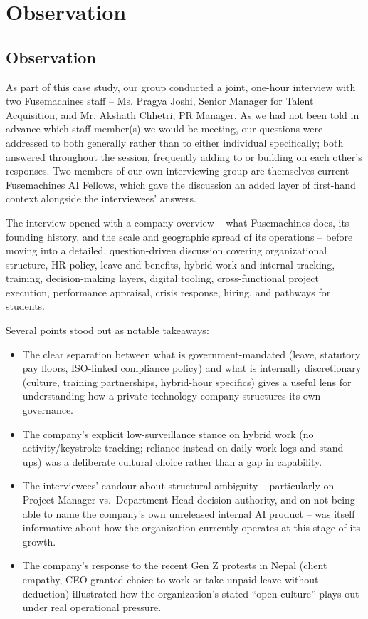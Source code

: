 \documentclass[12pt,a4paper]{report}
\begin{document}
\chapter{Observation}

\section{Observation}

As part of this case study, our group conducted a joint, one-hour interview with two Fusemachines staff -- Ms. Pragya Joshi, Senior Manager for Talent Acquisition, and Mr. Akshath Chhetri, PR Manager. As we had not been told in advance which staff member(s) we would be meeting, our questions were addressed to both generally rather than to either individual specifically; both answered throughout the session, frequently adding to or building on each other's responses. Two members of our own interviewing group are themselves current Fusemachines AI Fellows, which gave the discussion an added layer of first-hand context alongside the interviewees' answers.

The interview opened with a company overview -- what Fusemachines does, its founding history, and the scale and geographic spread of its operations -- before moving into a detailed, question-driven discussion covering organizational structure, HR policy, leave and benefits, hybrid work and internal tracking, training, decision-making layers, digital tooling, cross-functional project execution, performance appraisal, crisis response, hiring, and pathways for students.

Several points stood out as notable takeaways:
\begin{itemize}[leftmargin=1.5cm]
  \item The clear separation between what is government-mandated (leave, statutory pay floors, ISO-linked compliance policy) and what is internally discretionary (culture, training partnerships, hybrid-hour specifics) gives a useful lens for understanding how a private technology company structures its own governance.
  \item The company's explicit low-surveillance stance on hybrid work (no activity/keystroke tracking; reliance instead on daily work logs and stand-ups) was a deliberate cultural choice rather than a gap in capability.
  \item The interviewees' candour about structural ambiguity -- particularly on Project Manager vs.\ Department Head decision authority, and on not being able to name the company's own unreleased internal AI product -- was itself informative about how the organization currently operates at this stage of its growth.
  \item The company's response to the recent Gen Z protests in Nepal (client empathy, CEO-granted choice to work or take unpaid leave without deduction) illustrated how the organization's stated ``open culture'' plays out under real operational pressure.
\end{itemize}
\end{document}
